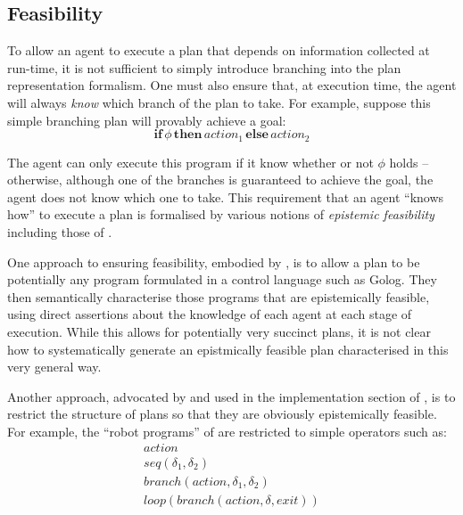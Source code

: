 \subsection{Feasibility}

To allow an agent to execute a plan that depends on information collected
at run-time, it is not sufficient to simply introduce branching into
the plan representation formalism. One must also ensure that, at execution
time, the agent will always \emph{know} which branch of the plan to
take. For example, suppose this simple branching plan will provably
achieve a goal:\[
\mathbf{if}\,\phi\,\mathbf{then}\, action_{1}\,\mathbf{else}\, action_{2}\]


The agent can only execute this program if it know whether or not
$\phi$ holds -- otherwise, although one of the branches is guaranteed
to achieve the goal, the agent does not know which one to take. This
requirement that an agent {}``knows how'' to execute a plan is formalised
by various notions of \emph{epistemic feasibility} including those
of \citep{levesque98what_robots_can_do,levesque00knowing_how,Lesperance01epi_feas_casl,giacomo04sem_delib_indigolog,baier06programs_that_sense}.

One approach to ensuring feasibility, embodied by \citep{levesque00knowing_how,giacomo04sem_delib_indigolog,baier06programs_that_sense},
is to allow a plan to be potentially any program formulated in a control
language such as Golog. They then semantically characterise those
programs that are epistemically feasible, using direct assertions
about the knowledge of each agent at each stage of execution. While
this allows for potentially very succinct plans, it is not clear how
to systematically generate an epistmically feasible plan characterised
in this very general way.

Another approach, advocated by \citep{levesque96what_is_planning,levesque98what_robots_can_do}
and used in the implementation section of \citep{giacomo04sem_delib_indigolog},
is to restrict the structure of plans so that they are obviously epistemically
feasible. For example, the {}``robot programs'' of \citep{levesque98what_robots_can_do}
are restricted to simple operators such as:\begin{gather*}
action\\
seq(\delta_{1},\delta_{2})\\
branch(action,\delta_{1},\delta_{2})\\
loop(branch(action,\delta,exit))\end{gather*}


